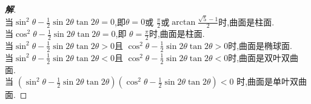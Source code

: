 \documentclass[a4paper]{article}
\begin{document}
\begin{proof}[\textbf{解}]
$$$$
当$\sin^2\theta-\frac{1}{2}\sin2\theta\tan2\theta=0$,即$\theta=0$或
$\frac{\pi}{2}$或$\arctan \frac{\sqrt{5}-1}{2}$时,曲面是柱面.\\
当$\cos^2\theta-\frac{1}{2}\sin2\theta\tan2\theta=0$,即
$\theta=\frac{\pi}{2}$时,曲面是柱面.\\
当$\sin^2\theta-\frac{1}{2}\sin2\theta\tan2\theta>0$且
$\cos^2\theta-\frac{1}{2}\sin2\theta\tan2\theta>0$时,曲面是椭球面.\\
当$\sin^2\theta-\frac{1}{2}\sin2\theta\tan2\theta<0$且
$\cos^2\theta-\frac{1}{2}\sin2\theta\tan2\theta<0$时,曲面是双叶双曲
面.\\
当
$(\sin^2\theta-\frac{1}{2}\sin2\theta\tan2\theta)(\cos^2\theta-\frac{1}{2}\sin2\theta\tan2\theta)<0$
时,曲面是单叶双曲面.
\end{proof}
\end{document}
